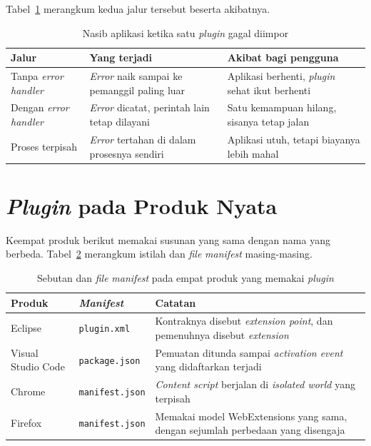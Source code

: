 Tabel~\ref{tab:isolasi} merangkum kedua jalur tersebut beserta akibatnya.

\begin{table}[htbp]
  \centering
  \caption{Nasib aplikasi ketika satu \textit{plugin} gagal diimpor}
  \label{tab:isolasi}
  \begin{tabularx}{\textwidth}{|l|X|X|}
    \hline
    \textbf{Jalur} & \textbf{Yang terjadi} & \textbf{Akibat bagi pengguna} \\
    \hline
    Tanpa \textit{error handler} & \textit{Error} naik sampai ke pemanggil paling luar & Aplikasi berhenti, \textit{plugin} sehat ikut berhenti \\
    \hline
    Dengan \textit{error handler} & \textit{Error} dicatat, perintah lain tetap dilayani & Satu kemampuan hilang, sisanya tetap jalan \\
    \hline
    Proses terpisah & \textit{Error} tertahan di dalam prosesnya sendiri & Aplikasi utuh, tetapi biayanya lebih mahal \\
    \hline
  \end{tabularx}
\end{table}

\section{\textit{Plugin} pada Produk Nyata}

Keempat produk berikut memakai susunan yang sama dengan nama yang berbeda.
Tabel~\ref{tab:produk-plugin} merangkum istilah dan \textit{file} \textit{manifest} masing-masing.

\begin{table}[htbp]
  \centering
  \caption{Sebutan dan \textit{file} \textit{manifest} pada empat produk yang memakai
    \textit{plugin}}
  \label{tab:produk-plugin}
  \begin{tabularx}{\textwidth}{|l|l|X|}
    \hline
    \textbf{Produk} & \textbf{\textit{Manifest}} & \textbf{Catatan} \\
    \hline
    Eclipse & \texttt{plugin.xml} & Kontraknya disebut \textit{extension point}, dan pemenuhnya disebut \textit{extension} \\
    \hline
    Visual Studio Code & \texttt{package.json} & Pemuatan ditunda sampai \textit{activation event} yang didaftarkan terjadi \\
    \hline
    Chrome & \texttt{manifest.json} & \textit{Content script} berjalan di \textit{isolated world} yang terpisah \\
    \hline
    Firefox & \texttt{manifest.json} & Memakai model WebExtensions yang sama, dengan sejumlah perbedaan yang disengaja \\
    \hline
  \end{tabularx}
\end{table}

